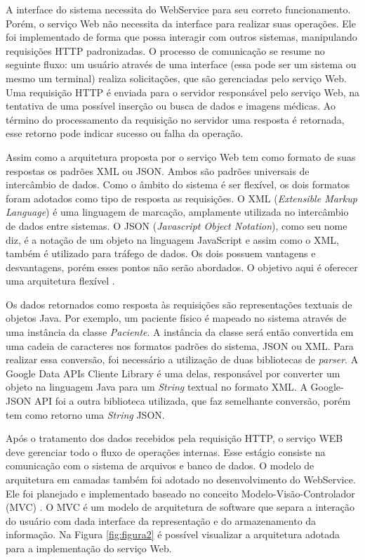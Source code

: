 A interface do sistema necessita do WebService para seu correto funcionamento. Porém, o serviço Web não necessita da interface para realizar suas operações. Ele foi implementado de forma que possa interagir com outros sistemas, manipulando requisições HTTP padronizadas.
O processo de comunicação se resume no seguinte fluxo: um usuário através de uma interface (essa pode ser um sistema ou mesmo um terminal) realiza solicitações, que são gerenciadas pelo serviço Web.
Uma requisição HTTP é enviada para o servidor responsável pelo serviço Web, na tentativa de uma possível inserção ou busca de dados e imagens médicas.
Ao término do processamento da requisição no servidor uma resposta é retornada, esse retorno pode indicar sucesso ou falha da operação.

Assim como a arquitetura proposta por \cite{REF10} o serviço Web tem como formato de suas respostas os padrões XML ou JSON.
Ambos são padrões universais de intercâmbio de dados. Como o âmbito do sistema é ser flexível, os dois formatos foram adotados como tipo de resposta as requisições.
O XML (\textit{Extensible Markup Language}) é uma linguagem de marcação, amplamente utilizada no intercâmbio de dados entre sistemas.
O JSON (\textit{Javascript Object Notation}), como seu nome diz, é a notação de um objeto na linguagem JavaScript e assim como o XML, também é utilizado para tráfego de dados.
Os dois possuem vantagens e desvantagens, porém esses pontos não serão abordados. O objetivo aqui é oferecer uma arquitetura flexível \cite{REF18}.

Os dados retornados como resposta às requisições são representações textuais de objetos Java.
Por exemplo, um paciente físico é mapeado no sistema através de uma instância da classe \textit{Paciente}.
A instância da classe será então convertida em uma cadeia de caracteres nos formatos padrões do sistema, JSON ou XML.
Para realizar essa conversão, foi necessário a utilização de duas bibliotecas de \textit{parser}.
A Google Data APIs Cliente Library é uma delas, responsável por converter um objeto na linguagem Java para um \textit{String} textual no formato XML.
A Google-JSON API foi a outra biblioteca utilizada, que faz semelhante conversão, porém tem como retorno uma \textit{String} JSON.

Após o tratamento dos dados recebidos pela requisição HTTP, o serviço WEB deve gerenciar todo o fluxo de operações internas. Esse estágio consiste na comunicação com o sistema de arquivos e banco de dados.
O modelo de arquitetura em camadas também foi adotado no desenvolvimento do WebService. Ele foi planejado e implementado baseado no conceito Modelo-Visão-Controlador (MVC) \cite{REF21}.
O MVC é um modelo de arquitetura de software que separa a interação do usuário com dada interface da representação e do armazenamento da informação. Na Figura \ref{fig:figura2} é possível visualizar a arquitetura adotada para a implementação do serviço Web.

